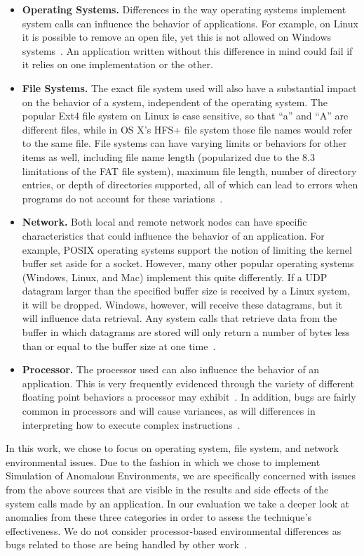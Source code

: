 \begin{itemize}

\item {\bf Operating Systems.} Differences in the way operating systems
implement system calls can influence the behavior of applications.  For
example, on Linux it is possible to remove an open file, yet this is not
allowed on Windows systems~\cite{UnlinkStandard}.  An application
written without this difference in mind could fail if it relies on one
implementation or the other.

\item {\bf File Systems.}  The exact file system used will also have a
substantial impact on the behavior of a system, independent of the
operating system.  The popular Ext4 file system on Linux is case sensitive,
so that ``a'' and ``A'' are different files,
while in OS X's HFS+ file system
those file names would refer to the same file.
File systems can have varying limits or behaviors for other items as well,
including file name length (popularized due to the 8.3 limitations of the
FAT file system), maximum file length, number of directory entries, or
depth
of directories supported, all of which can lead to errors when programs
do not account for these variations~\cite{EXT4Layout, AppleHFS}.

\item {\bf Network.} Both local and remote network nodes
can have specific characteristics that could influence the behavior of an
application.
For example, POSIX operating
systems support the notion of limiting the kernel buffer set aside for a
socket.  However, many other popular operating
systems (Windows, Linux, and Mac)
implement this quite differently.
If a UDP datagram
larger than the specified buffer size is received by a Linux system,
it will be dropped.
Windows,
however,
will receive these datagrams,
but it will influence data retrieval.
Any system calls that retrieve data from the buffer in which
datagrams are
stored will only return a number of bytes less than or equal to the
buffer size at one time~\cite{Zhuang_NSDI_2014}.

\item {\bf Processor.}  The processor used can also influence the
behavior of an application.  This is very frequently
evidenced through the variety of different floating point behaviors a
processor may exhibit~\cite{ArbitraryPrecision}.
In addition, bugs are fairly common
in processors and will cause variances, as will
differences in interpreting
how to execute complex instructions~\cite{Microarch}.

\end{itemize}

In this work, we chose to focus on operating system,
file system, and network
environmental issues.
Due to the fashion in which we chose
to implement Simulation of Anomalous Environments,
we are specifically concerned with issues from the above sources
that are visible in the results and side effects of the system calls
made by an application.
In our evaluation we take a deeper look at anomalies from
these three categories in order to assess the technique's effectiveness.
We do not consider processor-based environmental differences as bugs related to those are being handled by other
work~\cite{Alglave:2018:FSC:3173162.3177156}.
